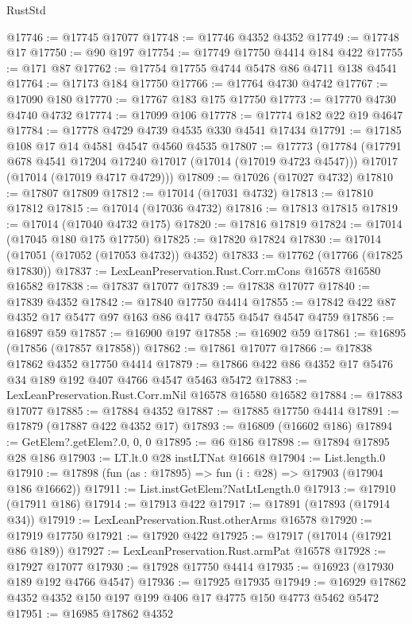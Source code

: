 \begin{lexlean}{RustStd}
\begin{coremodule}
@17746 := @17745 @17077
@17748 := @17746 @4352 @4352
@17749 := @17748 @17
@17750 := @90 @197
@17754 := @17749 @17750 @4414 @184 @422
@17755 := @171 @87
@17762 := @17754 @17755 @4744 @5478 @86 @4711 @138 @4541
@17764 := @17173 @184 @17750
@17766 := @17764 @4730 @4742
@17767 := @17090 @180
@17770 := @17767 @183 @175 @17750
@17773 := @17770 @4730 @4740 @4732
@17774 := @17099 @106
@17778 := @17774 @182 @22 @19 @4647
@17784 := @17778 @4729 @4739 @4535 @330 @4541 @17434
@17791 := @17185 @108 @17 @14 @4581 @4547 @4560 @4535
@17807 := @17773
    (@17784
      (@17791 @678 @4541 @17204 @17240 @17017 (@17014 (@17019 @4723 @4547)))
      @17017
      (@17014 (@17019 @4717 @4729)))
@17809 := @17026 (@17027 @4732)
@17810 := @17807 @17809
@17812 := @17014 (@17031 @4732)
@17813 := @17810 @17812
@17815 := @17014 (@17036 @4732)
@17816 := @17813 @17815
@17819 := @17014 (@17040 @4732 @175)
@17820 := @17816 @17819
@17824 := @17014 (@17045 @180 @175 @17750)
@17825 := @17820 @17824
@17830 := @17014 (@17051 (@17052 (@17053 @4732)) @4352)
@17833 := @17762 (@17766 (@17825 @17830))
@17837 := LexLeanPreservation.Rust.Corr.mCons @16578 @16580 @16582
@17838 := @17837 @17077
@17839 := @17838 @17077
@17840 := @17839 @4352
@17842 := @17840 @17750 @4414
@17855 := @17842 @422 @87 @4352 @17 @5477 @97 @163 @86 @417 @4755 @4547 @4547 @4759
@17856 := @16897 @59
@17857 := @16900 @197
@17858 := @16902 @59
@17861 := @16895 (@17856 (@17857 @17858))
@17862 := @17861 @17077
@17866 := @17838 @17862 @4352 @17750 @4414
@17879 := @17866 @422 @86 @4352 @17 @5476 @34 @189 @192 @407 @4766 @4547 @5463 @5472
@17883 := LexLeanPreservation.Rust.Corr.mNil @16578 @16580 @16582
@17884 := @17883 @17077
@17885 := @17884 @4352
@17887 := @17885 @17750 @4414
@17891 := @17879 (@17887 @422 @4352 @17)
@17893 := @16809 (@16602 @186)
@17894 := GetElem?.getElem?.{0, 0, 0}
@17895 := @6 @186
@17898 := @17894 @17895 @28 @186
@17903 := LT.lt.{0} @28 instLTNat @16618
@17904 := List.length.{0}
@17910 := @17898 (fun (as : @17895) => fun (i : @28) => @17903 (@17904 @186 @16662))
@17911 := List.instGetElem?NatLtLength.{0}
@17913 := @17910 (@17911 @186)
@17914 := @17913 @422
@17917 := @17891 (@17893 (@17914 @34))
@17919 := LexLeanPreservation.Rust.otherArms @16578
@17920 := @17919 @17750
@17921 := @17920 @422
@17925 := @17917 (@17014 (@17921 @86 @189))
@17927 := LexLeanPreservation.Rust.armPat @16578
@17928 := @17927 @17077
@17930 := @17928 @17750 @4414
@17935 := @16923 (@17930 @189 @192 @4766 @4547)
@17936 := @17925 @17935
@17949 := @16929 @17862 @4352 @4352 @150 @197 @199 @406 @17 @4775 @150 @4773 @5462 @5472
@17951 := @16985 @17862 @4352

\end{coremodule}
\end{lexlean}
